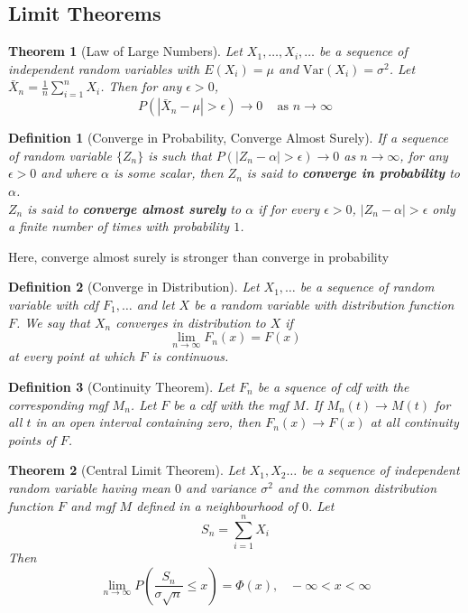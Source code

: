 \documentclass[12pt]{article}
\newcommand{\var}{\mathrm{Var}}
\newtheorem{definition}{Definition}[section]
\newtheorem{theorem}{Theorem}[section]
\theoremstyle{definition}
\begin{document}
\subsection{Limit Theorems}
\begin{theorem}[Law of Large Numbers]
\normalfont Let $X_1,\ldots, X_i,\ldots$ be a sequence of independent random variables with $E(X_i)=\mu$ and $\var(X_i)=\sigma^2$. Let $\bar{X}_n = \frac{1}{n}\sum_{i=1}^n X_i$. Then for any $\epsilon>0$,
\[
P(|\bar{X}_n-\mu|>\epsilon)\to 0\;\;\;\text{ as }n\to \infty
\]
\end{theorem}
\begin{definition}[Converge in Probability, Converge Almost Surely]
\normalfont If a sequence of random variable $\{Z_n\}$ is such that $P(|Z_n-\alpha|>\epsilon)\to 0$ as $n\to \infty$, for any $\epsilon>0$ and where $\alpha$ is some scalar, then $Z_n$ is said to \textbf{converge in probability} to $\alpha$.\\

$Z_n$ is said to \textbf{converge almost surely} to $\alpha$ if for every $\epsilon>0$, $|Z_n-\alpha|>\epsilon$ only a finite number of times with probability $1$.
\end{definition}
Here, converge almost surely is stronger than converge in probability
\begin{definition}[Converge in Distribution]
\normalfont Let $X_1,\ldots$ be a sequence of random variable with cdf $F_1,\ldots$ and let $X$ be a random variable with distribution function $F$. We say that $X_n$ converges in distribution to $X$ if
\[
\lim_{n\to \infty} F_n(x) = F(x)
\]
at every point at which $F$ is continuous.
\end{definition}
\begin{definition}[Continuity Theorem]
\normalfont Let $F_n$ be a squence of cdf with the corresponding mgf $M_n$. Let $F$ be a cdf with the mgf $M$. If $M_n(t)\to M(t)$ for all $t$ in an open interval containing zero, then $F_n(x)\to F(x)$ at all continuity points of $F$.
\end{definition}
\begin{theorem}[Central Limit Theorem]
\normalfont Let $X_1, X_2\ldots$ be a sequence of independent random variable having mean $0$ and variance $\sigma^2$ and the common distribution function $F$ and mgf $M$ defined in a neighbourhood of $0$. Let
\[
S_n = \sum_{i=1}^n X_i
\]
Then
\[
\lim_{n\to \infty} P(\frac{S_n}{\sigma \sqrt{n}}\leq x)=\Phi(x),\;\;\;-\infty<x<\infty
\]
\end{theorem}
\end{document}
